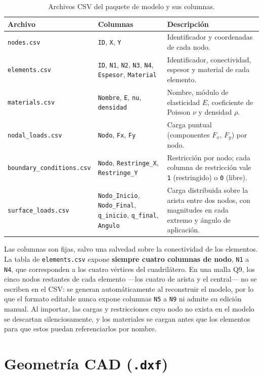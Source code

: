 \begin{table}[htbp]
\centering
\caption{Archivos CSV del paquete de modelo y sus columnas.}
\label{tab:csv-archivos}
\begin{tabular}{p{3.6cm} p{5.0cm} p{4.6cm}}
\toprule
\textbf{Archivo} & \textbf{Columnas} & \textbf{Descripción} \\
\midrule
\texttt{nodes.csv} & \texttt{ID}, \texttt{X}, \texttt{Y} & Identificador y coordenadas de cada nodo. \\
\texttt{elements.csv} & \texttt{ID}, \texttt{N1}, \texttt{N2}, \texttt{N3}, \texttt{N4}, \texttt{Espesor}, \texttt{Material} & Identificador, conectividad, espesor y material de cada elemento. \\
\texttt{materials.csv} & \texttt{Nombre}, \texttt{E}, \texttt{nu}, \texttt{densidad} & Nombre, módulo de elasticidad $E$, coeficiente de Poisson $\nu$ y densidad $\rho$. \\
\texttt{nodal\_loads.csv} & \texttt{Nodo}, \texttt{Fx}, \texttt{Fy} & Carga puntual (componentes $F_x$, $F_y$) por nodo. \\
\texttt{boundary\_conditions.csv} & \texttt{Nodo}, \texttt{Restringe\_X}, \texttt{Restringe\_Y} & Restricción por nodo; cada columna de restricción vale \texttt{1} (restringido) o \texttt{0} (libre). \\
\texttt{surface\_loads.csv} & \texttt{Nodo\_Inicio}, \texttt{Nodo\_Final}, \texttt{q\_inicio}, \texttt{q\_final}, \texttt{Angulo} & Carga distribuida sobre la arista entre dos nodos, con magnitudes en cada extremo y ángulo de aplicación. \\
\bottomrule
\end{tabular}
\end{table}

Las columnas son fijas, salvo una salvedad sobre la conectividad de los elementos. La tabla de \texttt{elements.csv} expone \textbf{siempre cuatro columnas de nodo}, \texttt{N1} a \texttt{N4}, que corresponden a los cuatro vértices del cuadrilátero. En una malla Q9, los cinco nodos restantes de cada elemento ---los cuatro de arista y el central--- no se escriben en el CSV: se generan automáticamente al reconstruir el modelo, por lo que el formato editable nunca expone columnas \texttt{N5} a \texttt{N9} ni admite su edición manual. Al importar, las cargas y restricciones cuyo nodo no exista en el modelo se descartan silenciosamente, y los materiales se cargan antes que los elementos para que estos puedan referenciarlos por nombre.

\section{Geometría CAD (\texttt{.dxf})}

